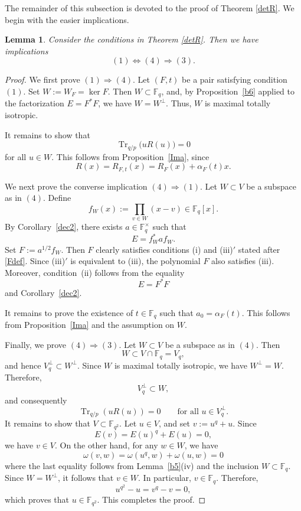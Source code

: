 \documentclass[12pt,a4paper]{amsart}
\newtheorem{lemma}[theorem]{Lemma}
\theoremstyle{definition}
\def\F{{\mathbb F}}
\theoremstyle{remark}
\DeclareMathOperator{\Tr}{Tr}
\begin{document}
\medskip

The remainder of this subsection is devoted to the proof of Theorem \ref{detR}. We begin with the easier implications. 
\begin{lemma}\label{i to iv to iii}
Consider the conditions in Theorem \ref{detR}. Then we have implications 
\[(1)\Longleftrightarrow(4)\Longrightarrow(3).\]
\end{lemma}
\begin{proof}
We first prove $(1)\Rightarrow(4)$. Let $(F,t)$ be a pair satisfying condition $(1)$. Set $W:=W_F=\ker F$. Then $W\subset \F_q$, and, by Proposition~\ref{b6} applied to the factorization $E=F^\ast F$, we have $W=W^\perp$. Thus, $W$ is maximal totally isotropic. 

It remains to show that 
\[
\Tr_{q/p}\bigl(uR(u)\bigr)=0
\]
    for all $u\in W$. This follows from Proposition~\ref{Ima}, since 
    \[R(x)=R_{F,t}(x)=R_F(x)+\alpha_F(t)x.  \]

We next prove the converse implication $(4)\Rightarrow(1)$. Let $W\subset V$ be a subspace as in $(4)$. Define 
\[f_W(x):=\prod_{v\in W}(x-v)\in \F_q[x].\]
By Corollary~\ref{dec2}, there exists $a\in \F_q^\times$ such that 
\[
E=f_W^\ast af_W. 
\]
Set $F:=a^{1/2}f_W$. Then $F$ clearly satisfies conditions (i) and (iii)$'$ stated after \eqref{Fdef}. Since (iii)$'$ is equivalent to (iii), the polynomial $F$ also satisfies (iii). 
Moreover, condition~\textup{(ii)} follows from the equality
\[
E=F^\ast F
\]
and Corollary~\ref{dec2}. 
 

It remains to prove the existence of $t\in \F_q$ such that $
a_0=\alpha_F(t)$. This follows from Proposition~\ref{Ima} and the assumption on $W$. 


\medskip 

\noindent
Finally, we prove $(4)\Rightarrow(3)$. Let $W\subset V$ be a subspace as in $(4)$. Then 
\[
W\subset V\cap \F_q=V_q, 
\]
and hence $V_q^\perp\subset W^\perp$. Since $W$ is maximal totally isotropic, we have $W^\perp=W$. Therefore,
\[
V_q^\perp\subset W,
\]
and consequently
\[
\Tr_{q/p}(uR(u))=0
\qquad
\text{for all }u\in V_q^\perp.
\]
It remains to show that $V\subset \F_{q^2}$. Let $u\in V$, and set $v:=u^q+u$. Since 
\[
E(v)=E(u)^q+E(u)=0, 
\]
we have $v\in V$. On the other hand, for any $w\in W$, we have 
\[
\omega(v,w)=\omega(u^q,w)+\omega(u,w)=0
\]
where the last equality follows from Lemma~\ref{b5}(iv) and the inclusion $W\subset \F_q$. Since $W=W^\perp$, it follows that $v\in W$. In particular, $v\in \F_q$. Therefore,
\[
u^{q^2}-u=v^q-v=0,
\]
which proves that $u\in \F_{q^2}$. 
This completes the proof. 
\end{proof}
\end{document}
